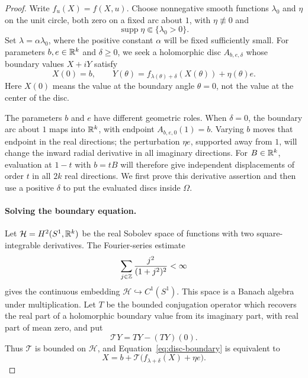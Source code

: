 \begin{proof}
Write $f_u(X)=f(X,u)$.  Choose nonnegative smooth functions $\lambda_0$
and $\eta$ on the unit circle, both zero on a fixed arc about $1$, with
$\eta\not\equiv0$ and
\[
 \operatorname{supp}\eta\Subset\{\lambda_0>0\}.
\]
Set $\lambda=\alpha\lambda_0$, where the positive constant $\alpha$ will
be fixed sufficiently small.  For parameters $b,e\in\mathbb R^k$ and
$\delta\ge0$, we seek a holomorphic disc $A_{b,e,\delta}$ whose boundary
values $X+iY$ satisfy
\begin{equation}\label{eq:disc-boundary}
 X(0)=b,
 \qquad
 Y(\theta)=f_{\lambda(\theta)+\delta}(X(\theta))+
             \eta(\theta)e.
\end{equation}
Here $X(0)$ means the value at the boundary angle $\theta=0$, not the
value at the center of the disc.

The parameters $b$ and $e$ have different geometric roles.  When $\delta=0$,
the boundary arc about $1$ maps into $\mathbb R^k$, with endpoint
$A_{b,e,0}(1)=b$.  Varying $b$ moves that endpoint in the real directions;
the perturbation $\eta e$, supported away from $1$, will change the inward
radial derivative in all imaginary directions.  For $B\in\mathbb R^k$,
evaluation at $1-t$ with $b=tB$ will therefore give independent
displacements of order $t$ in all
$2k$ real directions.  We first prove this derivative assertion and then
use a positive $\delta$ to put the evaluated discs inside $\Omega$.

\paragraph{Solving the boundary equation.}
Let $\mathcal H=H^2(S^1,\mathbb R^k)$ be the real Sobolev space of functions
with two square-integrable derivatives.  The Fourier-series estimate
\[
 \sum_{j\in\mathbb Z}\frac{j^2}{(1+j^2)^2}<\infty
\]
gives the continuous embedding $\mathcal H\hookrightarrow C^1(S^1)$.
This space is a Banach algebra under multiplication.  Let $T$ be the
bounded conjugation operator which recovers the real part of a
holomorphic boundary value from its imaginary part, with real part of
mean zero, and put
\[
 \mathcal T Y=TY-(TY)(0).
\]
Thus $\mathcal T$ is bounded on $\mathcal H$, and
Equation~\eqref{eq:disc-boundary} is equivalent to
\begin{equation}\label{eq:disc-contraction}
 X=b+\mathcal T\bigl(f_{\lambda+\delta}(X)+\eta e\bigr).
\end{equation}


\end{proof}
